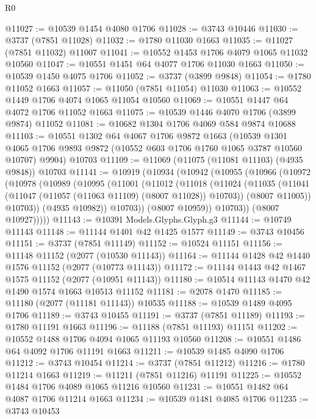 \begin{lexlean}{R0}
\begin{coremodule}
@11027 := @10539 @1454 @4080 @1706
@11028 := @3743 @10446
@11030 := @3737 (@7851 @11028)
@11032 := @1780 @11030 @1663
@11035 := @11027 (@7851 @11032) @11007
@11041 := @10552 @1453 @1706 @4079 @1065 @11032 @10560
@11047 := @10551 @1451 @64 @4077 @1706 @11030 @1663
@11050 := @10539 @1450 @4075 @1706
@11052 := @3737 (@3899 @9848)
@11054 := @1780 @11052 @1663
@11057 := @11050 (@7851 @11054) @11030
@11063 := @10552 @1449 @1706 @4074 @1065 @11054 @10560
@11069 := @10551 @1447 @64 @4072 @1706 @11052 @1663
@11075 := @10539 @1446 @4070 @1706 (@3899 @9874) @11052
@11081 := @10682 @1304 @1706 @4069 @584 @9874 @10688
@11103 := @10551
    @1302
    @64
    @4067
    @1706
    @9872
    @1663
    (@10539 @1301 @4065 @1706 @9893 @9872 (@10552 @603 @1706 @1760 @1065 @3787 @10560 @10707) @9904)
    @10703
@11109 := @11069 (@11075 (@11081 @11103) (@4935 @9848)) @10703
@11141 := @10919
    (@10934
      (@10942
        (@10955
          (@10966
            (@10972
              (@10978
                (@10989
                  (@10995
                    (@11001
                      (@11012
                        (@11018
                          (@11024
                            (@11035
                              (@11041 (@11047 (@11057 (@11063 @11109) (@8007 @11028)) @10703))
                              (@8007 @11005))
                            @10703))
                        (@4935 @10982))
                      @10703))
                  (@8007 @10959))
                @10703))
            (@8007 @10927)))))
@11143 := @10391 Models.Glyphs.Glyph.g3
@11144 := @10749 @11143
@11148 := @11144 @1401 @42 @1425 @1577
@11149 := @3743 @10456
@11151 := @3737 (@7851 @11149)
@11152 := @10524 @11151
@11156 := @11148 @11152 (@2077 (@10530 @11143))
@11164 := @11144 @1428 @42 @1440 @1576 @11152 (@2077 (@10773 @11143))
@11172 := @11144 @1443 @42 @1467 @1575 @11152 (@2077 (@10951 @11143))
@11180 := @10514 @11143 @1470 @42 @1490 @1574 @1663 @10513 @11152
@11181 := @2078 @1470
@11185 := @11180 (@2077 (@11181 @11143)) @10535
@11188 := @10539 @1489 @4095 @1706
@11189 := @3743 @10455
@11191 := @3737 (@7851 @11189)
@11193 := @1780 @11191 @1663
@11196 := @11188 (@7851 @11193) @11151
@11202 := @10552 @1488 @1706 @4094 @1065 @11193 @10560
@11208 := @10551 @1486 @64 @4092 @1706 @11191 @1663
@11211 := @10539 @1485 @4090 @1706
@11212 := @3743 @10454
@11214 := @3737 (@7851 @11212)
@11216 := @1780 @11214 @1663
@11219 := @11211 (@7851 @11216) @11191
@11225 := @10552 @1484 @1706 @4089 @1065 @11216 @10560
@11231 := @10551 @1482 @64 @4087 @1706 @11214 @1663
@11234 := @10539 @1481 @4085 @1706
@11235 := @3743 @10453

\end{coremodule}
\end{lexlean}
